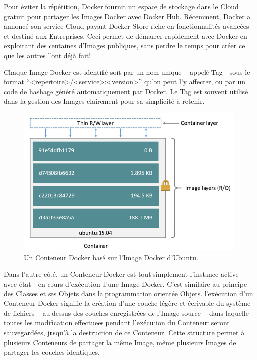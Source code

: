 Pour éviter la répétition, Docker fournit un espace de stockage dans le Cloud gratuit pour partager les Images Docker avec Docker Hub. Récemment, Docker a annoncé son service Cloud payant Docker Store riche en fonctionnalités avancées et destiné aux Entreprises. Ceci permet de démarrer rapidement avec Docker en exploitant des centaines d’Images publiques, sans perdre le temps pour créer ce que les autres l’ont déjà fait!
\newline

Chaque Image Docker est identifié soit par un nom unique – appelé Tag - sous le format “<repertoire>/<service>:<version>” qu’on peut l’y affecter, ou par un code de hashage généré automatiquement par Docker. Le Tag est souvent utilisé dans la gestion des Images clairement pour sa simplicité à retenir. 
\newline

\begin{figure}[H]
    \centering
    \includegraphics[width=12cm]{images/ubuntu-container.png}
    \caption{Un Conteneur Docker basé sur l'Image Docker d'Ubuntu.}
    \label{fig:ubuntu-container}
\end{figure}

Dans l’autre côté, un Conteneur Docker est tout simplement l’instance active – avec état - en cours d’exécution d’une Image Docker. C’est similaire au principe des Classes et ses Objets dans la programmation orientée Objets. l’exécution d’un Conteneur Docker signifie la création d’une couche légère et écrivable du système de fichiers – au-dessus des couches enregistrées de l’Image source -, dans laquelle toutes les modification effectuees pendant l’exécution du Conteneur seront sauvegardées, jusqu’à la destruction de ce Conteneur. Cette structure permet à plusieurs Conteneurs de partager la même Image, même plusieurs Images de partager les couches identiques.
\newline


